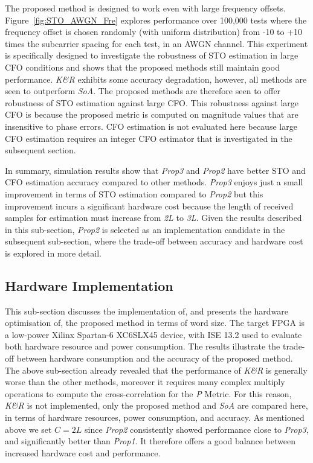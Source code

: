 The proposed method is designed to work even with large frequency offsets.
Figure~\ref{fig:STO_AWGN_Fre} explores performance over 100,000 tests where the frequency offset is chosen randomly (with uniform distribution) from -10 to +10 times the subcarrier spacing for each test, in an AWGN channel.
This experiment is specifically designed to investigate the robustness of STO estimation in large CFO conditions and shows that the proposed methods still maintain good performance. \textit{K\&R} exhibits some accuracy degradation, however, all methods are seen to outperform \textit{SoA}. The proposed methods are therefore seen to offer robustness of STO estimation against large CFO.
This robustness against large CFO is because the proposed metric is computed on magnitude values that are insensitive to phase errors.
CFO estimation is not evaluated here because large CFO estimation requires an integer CFO estimator that is investigated in the subsequent section.

In summary, simulation results show that \textit{Prop3} and \textit{Prop2} have better STO and CFO estimation accuracy compared to other methods.
\textit{Prop3} enjoys just a small improvement in terms of STO estimation compared to \textit{Prop2} but this improvement incurs a significant hardware cost because the length of received samples for estimation must increase from \emph{2L} to \emph{3L}.
Given the results described in this sub-section, \textit{Prop2} is selected as an implementation candidate in the subsequent sub-section, where the trade-off between accuracy and hardware cost is explored in more detail.

\subsection{Hardware Implementation}
This sub-section discusses the implementation of, and presents the hardware optimisation of, the proposed method in terms of word size. The target FPGA is a low-power Xilinx Spartan-6 XC6SLX45 device, with ISE 13.2 used to evaluate both hardware resource and power consumption.
The results illustrate the trade-off between hardware consumption and the accuracy of the proposed method.
The above sub-section already revealed that the performance of \textit{K\&R} is generally worse than the other methods, moreover it requires many complex multiply operations to compute the cross-correlation for the \emph{P} Metric. For this reason, \textit{K\&R} is not implemented, only the proposed method and \textit{SoA} are compared here, in terms of hardware resources, power consumption, and accuracy. As mentioned above we set  $C=2L$ since \textit{Prop2} consistently showed performance close to \textit{Prop3}, and significantly better than \textit{Prop1}. It  therefore offers a good balance between increased hardware cost and performance.

